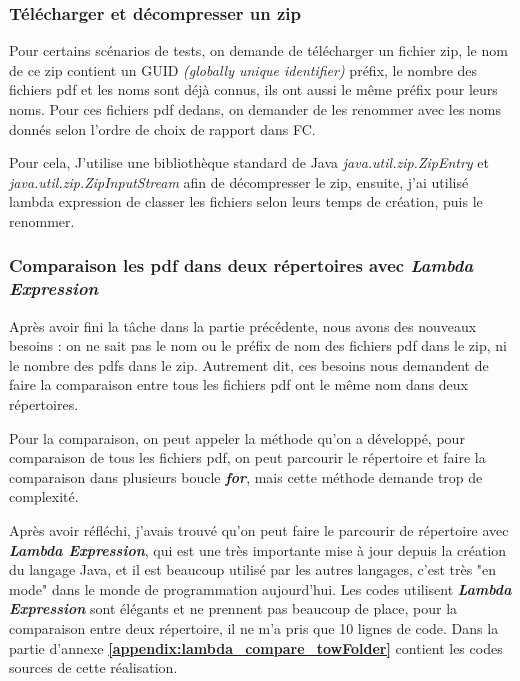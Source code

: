     \subsubsection{Télécharger et décompresser un zip}
    Pour certains scénarios de tests, on demande de télécharger un fichier zip, le nom de ce zip contient un GUID \textit{(globally unique identifier)} préfix, le nombre des fichiers pdf et les noms sont déjà connus, ils ont aussi le même préfix pour leurs noms. Pour ces  fichiers pdf dedans, on demander de les renommer avec les noms donnés selon l'ordre de choix de rapport dans FC.
    
    \par Pour cela, J'utilise une bibliothèque standard de Java  \textit{java.util.zip.ZipEntry} et  \textit{java.util.zip.ZipInputStream} afin de décompresser le zip, ensuite, j'ai utilisé lambda expression de classer les fichiers selon leurs temps de création, puis le renommer.
    
    \subsubsection{Comparaison les pdf dans deux répertoires avec \textbf{\textit{Lambda Expression}}}
    Après avoir fini la tâche dans la partie précédente, nous avons des nouveaux besoins : on ne sait pas le nom ou le préfix de nom des fichiers pdf dans le zip, ni le nombre des pdfs dans le zip. Autrement dit, ces besoins nous demandent de faire la comparaison entre tous les fichiers pdf ont le même nom dans deux répertoires. 
    
    \par Pour la comparaison, on peut appeler la méthode qu'on a développé, pour comparaison de tous les fichiers pdf, on peut parcourir le répertoire et faire la comparaison dans plusieurs boucle \textit{\textbf{for}}, mais cette méthode demande trop de complexité. 
    
    \par Après avoir réfléchi, j'avais trouvé qu'on peut faire le parcourir de répertoire avec \textit{\textbf{Lambda Expression}}, qui est une très importante mise à jour depuis la création du langage Java, et il est beaucoup utilisé par les autres langages, c'est très "en mode" dans le monde de programmation aujourd'hui. Les codes utilisent \textbf{\textit{Lambda Expression}} sont élégants et ne prennent pas beaucoup de place, pour la comparaison entre deux répertoire, il ne m'a pris que 10 lignes de code. Dans la partie d'annexe \textbf{\ref{appendix:lambda_compare_towFolder}} contient les codes sources de cette réalisation. 
    
